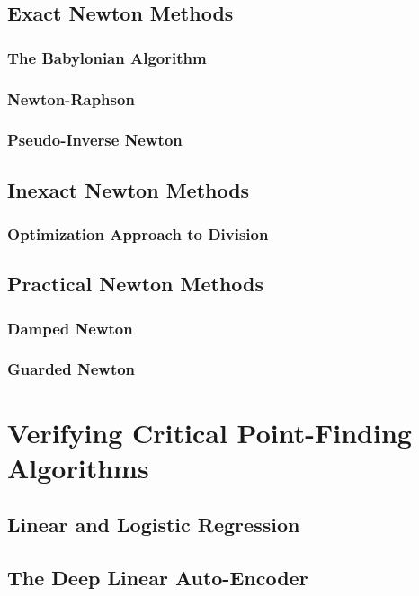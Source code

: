 \documentclass[../../thesis.tex]{subfiles}
\begin{document}
\subsection{Exact Newton Methods}

\subsubsection{The Babylonian Algorithm}

\subsubsection{Newton-Raphson}

\subsubsection{Pseudo-Inverse Newton}

\subsection{Inexact Newton Methods}

\subsubsection{Optimization Approach to Division}

\subsection{Practical Newton Methods}

\subsubsection{Damped Newton}

\subsubsection{Guarded Newton}

\section{Verifying Critical Point-Finding Algorithms}

\subsection{Linear and Logistic Regression}

\subsection{The Deep Linear Auto-Encoder}

\onlyinsubfile{\printbibliography}
\end{document}

